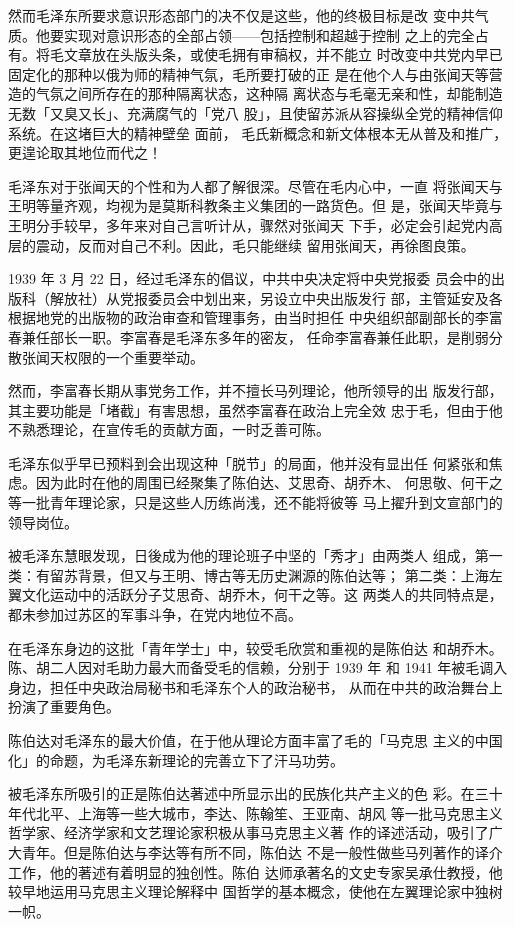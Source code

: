 然而毛泽东所要求意识形态部门的决不仅是这些，他的终极目标是改
变中共气质。他要实现对意识形态的全部占领——包括控制和超越于控制
之上的完全占有。将毛文章放在头版头条，或使毛拥有审稿权，并不能立
时改变中共党内早已固定化的那种以俄为师的精神气氛，毛所要打破的正
是在他个人与由张闻天等营造的气氛之间所存在的那种隔离状态，这种隔
离状态与毛毫无亲和性，却能制造无数「又臭又长」、充满腐气的「党八
股」，且使留苏派从容操纵全党的精神信仰系统。在这堵巨大的精神壁垒
面前，
毛氏新概念和新文体根本无从普及和推广，
更遑论取其地位而代之！

毛泽东对于张闻天的个性和为人都了解很深。尽管在毛内心中，一直
将张闻天与王明等量齐观，均视为是莫斯科教条主义集团的一路货色。但
是，张闻天毕竟与王明分手较早，多年来对自己言听计从，骤然对张闻天
下手，必定会引起党内高层的震动，反而对自己不利。因此，毛只能继续
留用张闻天，再徐图良策。

1939 年 3 月 22 日，经过毛泽东的倡议，中共中央决定将中央党报委
员会中的出版科（解放社）从党报委员会中划出来，另设立中央出版发行
部，主管延安及各根据地党的出版物的政治审查和管理事务，由当时担任
中央组织部副部长的李富春兼任部长一职。李富春是毛泽东多年的密友，
任命李富春兼任此职，是削弱分散张闻天权限的一个重要举动。

然而，李富春长期从事党务工作，并不擅长马列理论，他所领导的出
版发行部，其主要功能是「堵截」有害思想，虽然李富春在政治上完全效
忠于毛，但由于他不熟悉理论，在宣传毛的贡献方面，一时乏善可陈。

毛泽东似乎早已预料到会出现这种「脱节」的局面，他并没有显出任
何紧张和焦虑。因为此时在他的周围已经聚集了陈伯达、艾思奇、胡乔木、
何思敬、何干之等一批青年理论家，只是这些人历练尚浅，还不能将彼等
马上擢升到文宣部门的领导岗位。

被毛泽东慧眼发现，日後成为他的理论班子中坚的「秀才」由两类人
组成，第一类：有留苏背景，但又与王明、博古等无历史渊源的陈伯达等；
第二类：上海左翼文化运动中的活跃分子艾思奇、胡乔木，何干之等。这
两类人的共同特点是，都未参加过苏区的军事斗争，在党内地位不高。

在毛泽东身边的这批「青年学士」中，较受毛欣赏和重视的是陈伯达
和胡乔木。陈、胡二人因对毛助力最大而备受毛的信赖，分别于 1939 年
和 1941 年被毛调入身边，担任中央政治局秘书和毛泽东个人的政治秘书，
从而在中共的政治舞台上扮演了重要角色。

陈伯达对毛泽东的最大价值，在于他从理论方面丰富了毛的「马克思
主义的中国化」的命题，为毛泽东新理论的完善立下了汗马功劳。

被毛泽东所吸引的正是陈伯达著述中所显示出的民族化共产主义的色
彩。在三十年代北平、上海等一些大城市，李达、陈翰笙、王亚南、胡风
等一批马克思主义哲学家、经济学家和文艺理论家积极从事马克思主义著
作的译述活动，吸引了广大青年。但是陈伯达与李达等有所不同，陈伯达
不是一般性做些马列著作的译介工作，他的著述有着明显的独创性。陈伯
达师承著名的文史专家吴承仕教授，他较早地运用马克思主义理论解释中
国哲学的基本概念，使他在左翼理论家中独树一帜。

